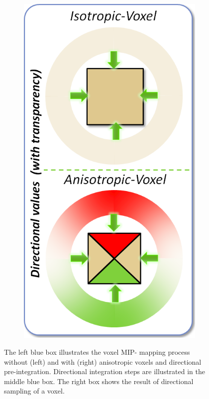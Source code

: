 \begin{figure}
\begin{subfigure}[b]{0.215\textwidth}
		\includegraphics{graphics/vct/vct-10-2}
	\end{subfigure}
	\caption{The left blue box illustrates the voxel MIP- mapping process without (left) and with (right) anisotropic voxels and directional pre-integration. Directional integration steps are illustrated in the middle blue box. The right box shows the result of directional sampling of a voxel.}
\end{figure}


